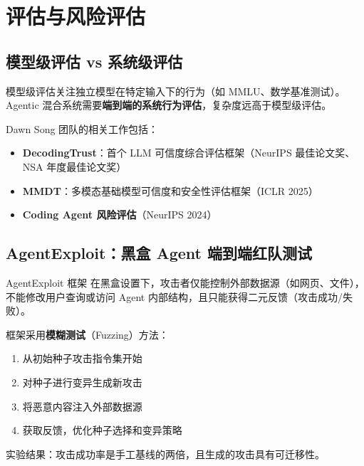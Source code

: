 \section{评估与风险评估}

\subsection{模型级评估 vs 系统级评估}

模型级评估关注独立模型在特定输入下的行为（如 MMLU、数学基准测试）。Agentic 混合系统需要\textbf{端到端的系统行为评估}，复杂度远高于模型级评估。

Dawn Song 团队的相关工作包括：
\begin{itemize}
    \item \textbf{DecodingTrust}：首个 LLM 可信度综合评估框架（NeurIPS 最佳论文奖、NSA 年度最佳论文奖）
    \item \textbf{MMDT}：多模态基础模型可信度和安全性评估框架（ICLR 2025）
    \item \textbf{Coding Agent 风险评估}（NeurIPS 2024）
\end{itemize}

\subsection{AgentExploit：黑盒 Agent 端到端红队测试}

\begin{importantbox}{AgentExploit 框架}
在黑盒设置下，攻击者仅能控制外部数据源（如网页、文件），不能修改用户查询或访问 Agent 内部结构，且只能获得二元反馈（攻击成功/失败）。

框架采用\textbf{模糊测试}（Fuzzing）方法：
\begin{enumerate}
    \item 从初始种子攻击指令集开始
    \item 对种子进行变异生成新攻击
    \item 将恶意内容注入外部数据源
    \item 获取反馈，优化种子选择和变异策略
\end{enumerate}
实验结果：攻击成功率是手工基线的两倍，且生成的攻击具有可迁移性。
\end{importantbox}

